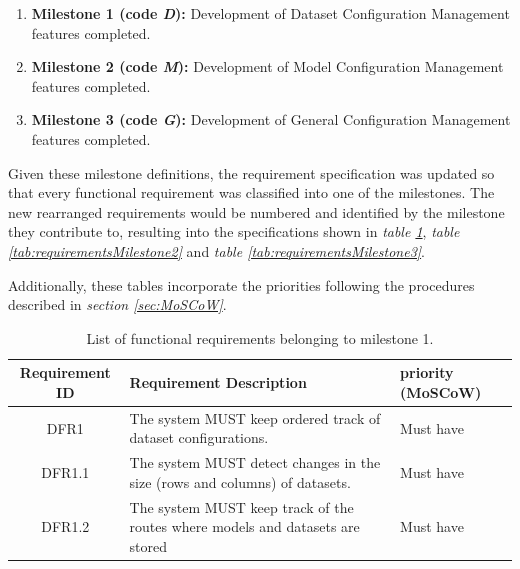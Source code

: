 \begin{enumerate}
    \item \textbf{Milestone 1 (code \emph{D}):} Development of Dataset Configuration Management features completed.
    \item \textbf{Milestone 2 (code \emph{M}):} Development of Model Configuration Management features completed.
    \item \textbf{Milestone 3 (code \emph{G}):} Development of General Configuration Management features completed.
\end{enumerate}

Given these milestone definitions, the requirement specification was updated so that every functional requirement was classified into one of the milestones. The new 
rearranged requirements would be numbered and identified by the milestone they contribute to, resulting into the specifications shown in \emph{table \ref{tab:requirementsMilestone1}}, \emph{table \ref{tab:requirementsMilestone2}} and \emph{table \ref{tab:requirementsMilestone3}}.

Additionally, these tables incorporate the priorities following the procedures described in \emph{section \ref{sec:MoSCoW}}.

\begin{table}[H]
	\centering
	\caption{List of functional requirements belonging to milestone 1.}
	\label{tab:requirementsMilestone1}
	\begin{tabular}{ | c | p{9cm} | p{3cm} |}
		\hline
		\textbf{Requirement ID} & \textbf{Requirement Description} & \textbf{priority (MoSCoW)} \\ \hline
		DFR1     & The system MUST keep ordered track of dataset configurations.                    & Must have\\ \hline
		DFR1.1   & The system MUST detect changes in the size (rows and columns) of datasets.       & Must have\\ \hline
		DFR1.2   & The system MUST keep track of the routes where models and datasets are stored    & Must have\\ \hline
	\end{tabular}
\end{table}

